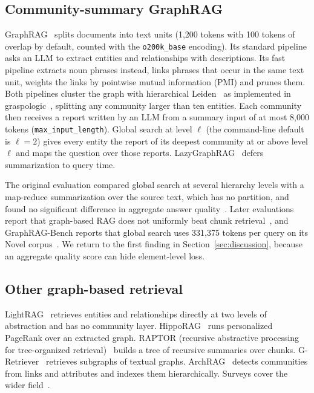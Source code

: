 \documentclass[journal]{IEEEtran}
\theoremstyle{remark}
\begin{document}
\subsection{Community-summary GraphRAG}
GraphRAG~\cite{edge2024graphrag,graphrag311} splits documents into text units (1,200 tokens with 100 tokens of overlap by default, counted with the \texttt{o200k\_base} encoding). Its standard pipeline asks an LLM to extract entities and relationships with descriptions. Its fast pipeline extracts noun phrases instead, links phrases that occur in the same text unit, weights the links by pointwise mutual information (PMI) and prunes them. Both pipelines cluster the graph with hierarchical Leiden~\cite{traag2019leiden} as implemented in graspologic~\cite{chung2019graspy}, splitting any community larger than ten entities. Each community then receives a report written by an LLM from a summary input of at most 8,000 tokens (\texttt{max\_input\_length}). Global search at level $\ell$ (the command-line default is $\ell=2$) gives every entity the report of its deepest community at or above level $\ell$ and maps the question over those reports. LazyGraphRAG~\cite{edge2024lazygraphrag} defers summarization to query time.

The original evaluation compared global search at several hierarchy levels with a map-reduce summarization over the source text, which has no partition, and found no significant difference in aggregate answer quality~\cite{edge2024graphrag}. Later evaluations report that graph-based RAG does not uniformly beat chunk retrieval~\cite{han2025ragvsgraphrag,xiang2026graphragbench,zhou2025indepth}, and GraphRAG-Bench reports that global search uses 331,375 tokens per query on its Novel corpus~\cite{xiang2026graphragbench}. We return to the first finding in Section~\ref{sec:discussion}, because an aggregate quality score can hide element-level loss.

\subsection{Other graph-based retrieval}
LightRAG~\cite{guo2024lightrag} retrieves entities and relationships directly at two levels of abstraction and has no community layer. HippoRAG~\cite{gutierrez2024hipporag} runs personalized PageRank over an extracted graph. RAPTOR (recursive abstractive processing for tree-organized retrieval)~\cite{sarthi2024raptor} builds a tree of recursive summaries over chunks. G-Retriever~\cite{he2024gretriever} retrieves subgraphs of textual graphs. ArchRAG~\cite{wang2026archrag} detects communities from links and attributes and indexes them hierarchically. Surveys cover the wider field~\cite{peng2024graphragsurvey}.
\end{document}
